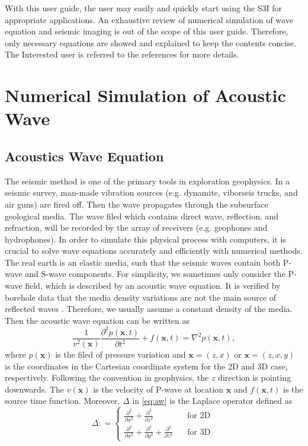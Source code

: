 \documentclass[11pt,titlepage]{article}
\newcommand{\bx}{\boldsymbol{x}}
\theoremstyle{plain}
\theoremstyle{definition}
\theoremstyle{remark}
\numberwithin{equation}{section}
\begin{document}
With this user guide, the user may easily and quickly start using the S3I for appropriate applications. An exhaustive review of numerical simulation of wave equation and seismic imaging is out of the scope of this user guide. Therefore, only necessary equations are showed and explained to keep the contents concise. The Interested user is referred to the references for more details.  



\section{Numerical Simulation of Acoustic Wave}


\subsection{Acoustics Wave Equation}
The seismic method is one of the primary tools in exploration geophysics. In a seismic survey, man-made vibration sources (e.g. dynamite, viborseis trucks, and air guns) are fired off. Then the wave propagates through the subsurface geological media. The wave filed which contains direct wave, reflection, and refraction, will be recorded by the array of receivers (e.g. geophones and hydrophones). In order to simulate this physical process with computers, it is crucial to solve wave equations accurately and efficiently with numerical methods. The real earth is an elastic media, such that the seismic waves contain both P-wave and S-wave components. For simplicity, we sometimes only consider the P-wave field, which is described by an acoustic wave equation. It is verified by borehole data that the media density variations are not the main source of reflected waves \cite{Hood:1981aa}. Therefore, we usually assume a constant density of the media. Then the acoustic wave equation can be written as
\begin{equation}\label{eq:aw}
\frac{1}{v^2(\bx)}\frac{\partial^2 p(\bx, t)}{\partial t^2} + f(\bx, t) = \nabla^2 p(\bx, t),
\end{equation}
where $p(\bx)$ is the filed of pressure variation and $\bx=(z,x)$ or $\bx=(z,x,y)$ is the coordinates in the Cartesian coordinate system for the 2D and 3D case, respectively. Following the convention in geophysics, the $z$ direction is pointing downwards. The $v(\bx)$ is the velocity of P-wave at location $\bx$ and $f(\bx,t)$ is the source time function. Moreover, $\Delta$ in \eqref{eq:aw} is the Laplace operator defined as 
\begin{equation}
\Delta: =\left\{
\begin{aligned}
\frac{\partial^2}{\partial x^2}+\frac{\partial^2}{\partial z^2}~~~~~~~ & ~~~~\text{for 2D }\\
\frac{\partial^2}{\partial x^2}+\frac{\partial^2}{\partial y^2}+\frac{\partial^2}{\partial z^2} &~~~~ \text{for 3D}
\end{aligned}
\right.  
\end{equation}
\end{document}
